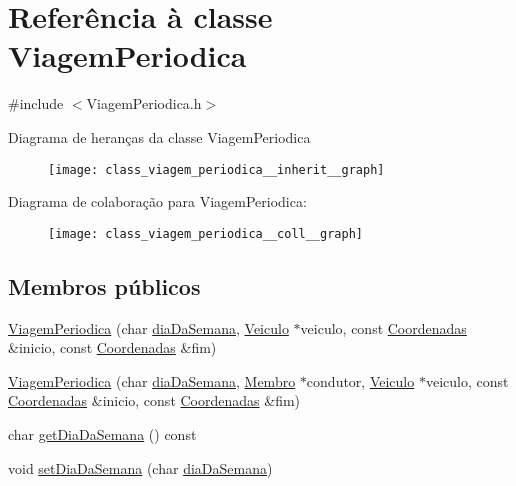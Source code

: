 \hypertarget{class_viagem_periodica}{\section{Referência à classe Viagem\+Periodica}
\label{class_viagem_periodica}
}


{\ttfamily \#include $<$Viagem\+Periodica.\+h$>$}



Diagrama de heranças da classe Viagem\+Periodica\nopagebreak
\begin{figure}[H]
\begin{center}
\leavevmode
\texttt{[image: class\_viagem\_periodica\_\_inherit\_\_graph]}
\end{center}
\end{figure}


Diagrama de colaboração para Viagem\+Periodica\+:\nopagebreak
\begin{figure}[H]
\begin{center}
\leavevmode
\texttt{[image: class\_viagem\_periodica\_\_coll\_\_graph]}
\end{center}
\end{figure}
\subsection*{Membros públicos}
\begin{DoxyCompactItemize}
\item 
\hyperlink{class_viagem_periodica_aac7574ed67f67dad6d16751c2d024670}{Viagem\+Periodica} (char \hyperlink{class_viagem_periodica_ac53255ef9f3e6d862e2ac803d7e45206}{dia\+Da\+Semana}, \hyperlink{class_veiculo}{Veiculo} $\ast$veiculo, const \hyperlink{class_coordenadas}{Coordenadas} \&inicio, const \hyperlink{class_coordenadas}{Coordenadas} \&fim)
\item 
\hyperlink{class_viagem_periodica_a13fc61d10fe1d8f3ced8e7f9557c2553}{Viagem\+Periodica} (char \hyperlink{class_viagem_periodica_ac53255ef9f3e6d862e2ac803d7e45206}{dia\+Da\+Semana}, \hyperlink{class_membro}{Membro} $\ast$condutor, \hyperlink{class_veiculo}{Veiculo} $\ast$veiculo, const \hyperlink{class_coordenadas}{Coordenadas} \&inicio, const \hyperlink{class_coordenadas}{Coordenadas} \&fim)
\item 
char \hyperlink{class_viagem_periodica_a18ccdd2f58dd4fbf3dc95e1927a61af7}{get\+Dia\+Da\+Semana} () const 
\item 
void \hyperlink{class_viagem_periodica_a1351abcca608d827c5c4eb7ba2f45e14}{set\+Dia\+Da\+Semana} (char \hyperlink{class_viagem_periodica_ac53255ef9f3e6d862e2ac803d7e45206}{dia\+Da\+Semana})
\end{DoxyCompactItemize}
